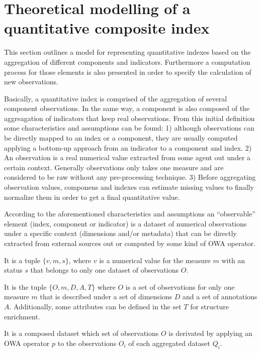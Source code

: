 \documentclass{llncs}
\begin{document}
\section{Theoretical modelling of a quantitative composite index}
This section outlines a model for representing quantitative indexes based on the aggregation 
of different components and indicators. Furthermore a computation process for those elements is 
also presented in order to specify the calculation of new observations.

Basically, a quantitative index is comprised of the aggregation of several component observations. In the same way, 
a component is also composed of the aggreagation of indicators that keep real observations. From this initial definition 
some characteristics and assumptions can be found: 1) although observations can be directly mapped to an index or a component, they 
are usually computed applying a bottom-up approach from an indicator to a component and index. 2) An observation is 
a real numerical value extracted from some agent out under a certain context. Generally observations only takes one measure and are considered 
to be raw without any pre-processing technique. 3) Before aggregating observation values, componens and indexes can 
estimate missing values to finally normalize them in order to get a final quantitative value.

According to the aforementioned characteristics and assumptions an ``observable'' element (index, component or indicator) is a 
dataset of numerical observations under a specific context (dimensions and/or metadata) that can be directly extracted from external 
sources out or computed by some kind of OWA operator. 

\begin{definition}[Observation-$o$]\upshape
It is a tuple $\{v,m,s\}$, where $v$ is a numerical value for the measure $m$ with an status $s$ that belongs to 
only one dataset of observations $O$. 
\end{definition}


\begin{definition}[Dataset-$q$]\upshape
It is the tuple $\{O,m,D,A,T\}$ where $O$ is a set of observations for only one measure $m$ that is described under 
a set of dimensions $D$ and a set of annotations $A$. Additionally, some attributes can be defined in the set $T$ for structure enrichment. 
\end{definition}


\begin{definition}\upshape
It is a composed dataset which set of observations $O$ is derivated by applying 
an OWA operator $p$ to the observations $O_i$ of each aggregated dataset $Q_i$.
\end{definition}
\end{document}
